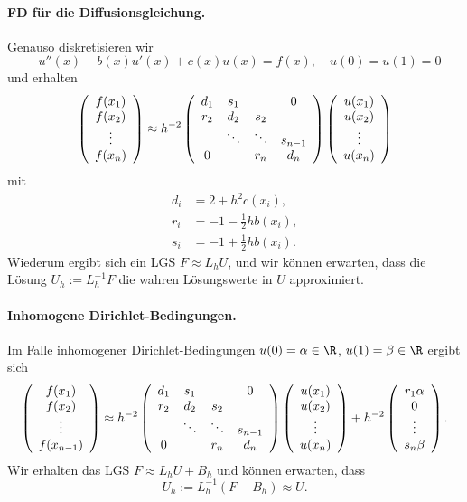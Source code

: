 \documentclass[
]{mycourse}
\theoremstyle{mythm}
\theoremstyle{break}
\begin{document}
\paragraph{FD für die Diffusionsgleichung.}
Genauso diskretisieren wir
\[
-u''(x) + b(x)u'(x) + c(x)u(x)=f(x), \quad u(0)=u(1)=0
\]
und erhalten
\[
\left( \begin{array}{c} f(x_1)\\ f(x_2)\\ \vdots \\ f(x_{n}) \end{array}\right)
\approx h^{-2} \left( \begin{array}{c c c c} d_1 & s_1 &  & 0\\ r_2 & d_2 & s_2 \\ & \ddots & \ddots & s_{n-1}\\ 0  &  & r_{n} & d_{n}\end{array}\right) 
\left( \begin{array}{c} u(x_1)\\ u(x_2)\\ \vdots \\ u(x_{n}) \end{array}\right)
\]
mit
\begin{align*}
d_i&=2+h^2 c(x_i),\\
r_i&=-1-\frac 12 hb(x_i),\\
s_i&=-1+\frac 12 hb(x_i).
\end{align*}
Wiederum ergibt sich ein LGS $F\approx L_h U$, und wir können erwarten, dass die
Lösung $U_h:=L_h^{-1} F$ die wahren Lösungswerte in $U$ approximiert.

\paragraph{Inhomogene Dirichlet-Bedingungen.} 
Im Falle inhomogener Dirichlet-Bedingungen $u(0)=\alpha\in \R$, $u(1)=\beta\in \R$ ergibt sich
\[
\left( \begin{array}{c} f(x_1)\\ f(x_2)\\ \vdots \\ f(x_{n-1}) \end{array}\right)
\approx h^{-2} \left( \begin{array}{c c c c} d_1 & s_1 &  & 0\\ r_2 & d_2 & s_2 \\ & \ddots & \ddots & s_{n-1}\\ 0  &  & r_{n} & d_{n}\end{array}\right) 
\left( \begin{array}{c} u(x_1)\\ u(x_2)\\ \vdots \\ u(x_{n}) \end{array}\right)
+ h^{-2}
\left( \begin{array}{c} r_1 \alpha\\ 0 \\ \vdots \\ s_{n} \beta \end{array}\right).
\]
Wir erhalten das LGS $F\approx L_h U+B_h$ und können erwarten, dass \[
U_h:=L_h^{-1} (F-B_h)\approx U.
\]
\end{document}
